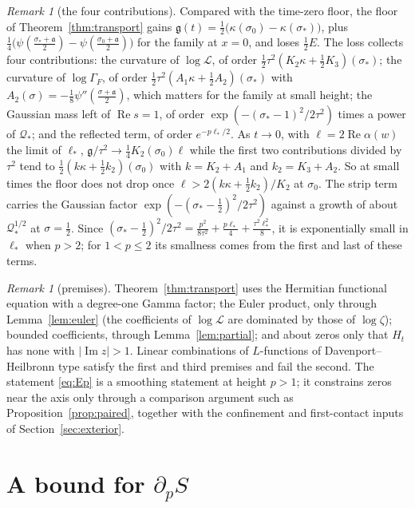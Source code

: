 \documentclass[11pt]{article}
\theoremstyle{definition}
\theoremstyle{remark}
\newtheorem{remark}[theorem]{Remark}
\newcommand{\cL}{\mathcal L}
\newcommand{\fa}{\mathfrak a}
\newcommand{\re}{\operatorname{Re}}
\newcommand{\im}{\operatorname{Im}}
\numberwithin{equation}{section}
\begin{document}
\begin{remark}[the four contributions]\label{rem:costs}
Compared with the time-zero floor, the floor of Theorem~\ref{thm:transport}
gains
$\mathfrak g(t)=\frac12\bigl(\kappa(\sigma_0)-\kappa(\sigma_*)\bigr)$, plus
$\frac14\bigl(\psi(\frac{\sigma_*+\fa}2)-\psi(\frac{\sigma_0+\fa}2)\bigr)$
for the family at $x=0$, and loses $\frac12E$. The loss collects four
contributions: the curvature of $\log\cL$, of order
$\frac12\tau^2(K_2\kappa+\frac12K_3)(\sigma_*)$; the curvature of
$\log\Gamma_F$, of order $\frac12\tau^2(A_1\kappa+\frac12A_2)(\sigma_*)$
with $A_2(\sigma)=-\frac18\psi''(\frac{\sigma+\fa}2)$, which matters for
the family at small height; the Gaussian mass left of $\re s=1$, of order
$\exp(-(\sigma_*-1)^2/2\tau^2)$ times a power of $\mathcal Q_*$; and the
reflected term, of order $e^{-p\ell_*/2}$. As $t\to0$, with
$\ell=2\re\alpha(w)$ the limit of $\ell_*$,
$\mathfrak g/\tau^2\to\frac14K_2(\sigma_0)\ell$ while the first two
contributions divided by $\tau^2$ tend to
$\frac12(k\kappa+\frac12k_2)(\sigma_0)$ with $k=K_2+A_1$ and
$k_2=K_3+A_2$. So at small times the floor does not drop once
$\ell>2(k\kappa+\frac12k_2)/K_2$ at $\sigma_0$. The strip term carries the
Gaussian factor $\exp(-(\sigma_*-\frac12)^2/2\tau^2)$ against a growth of
about $\mathcal Q_*^{1/2}$ at $\sigma=\frac12$. Since
$(\sigma_*-\frac12)^2/2\tau^2=\frac{p^2}{8\tau^2}+\frac{p\ell_*}4+\frac{\tau^2\ell_*^2}8$,
it is exponentially small in $\ell_*$ when $p>2$; for $1<p\le2$ its
smallness comes from the first and last of these terms.
\end{remark}

\begin{remark}[premises]\label{rem:premises}
Theorem~\ref{thm:transport} uses the Hermitian functional equation with a
degree-one Gamma factor; the Euler product, only through
Lemma~\ref{lem:euler} (the coefficients of $\log\cL$ are dominated by those
of $\log\zeta$); bounded coefficients, through Lemma~\ref{lem:partial}; and
about zeros only that $H_t$ has none with $\lvert\im z\rvert>1$.
Linear combinations of $L$-functions of Davenport--Heilbronn type satisfy
the first and third premises and fail the second. The statement
\eqref{eq:Ep} is a smoothing statement at height $p>1$; it constrains
zeros near the axis only through a comparison argument such as
Proposition~\ref{prop:paired}, together with the confinement and
first-contact inputs of Section~\ref{sec:exterior}.
\end{remark}

\section{A bound for \texorpdfstring{$\partial_pS$}{the vertical derivative}}\label{sec:derivative}
\end{document}

